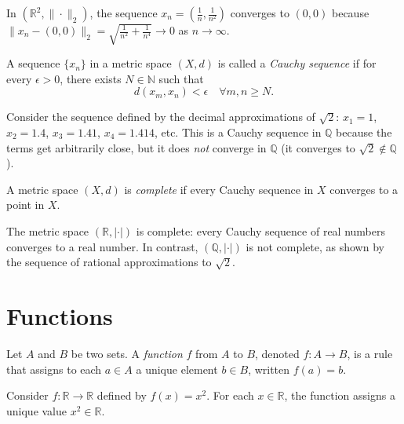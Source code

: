 \begin{example}
In $(\mathbb{R}^2, \|\cdot\|_2)$, the sequence $x_n = \left(\frac{1}{n}, \frac{1}{n^2}\right)$ converges to $(0,0)$ because $\|x_n - (0,0)\|_2 = \sqrt{\frac{1}{n^2} + \frac{1}{n^4}} \to 0$ as $n \to \infty$.
\end{example}

\begin{definition}
A sequence $\{x_n\}$ in a metric space $(X,d)$ is called a \emph{Cauchy sequence} if for every $\epsilon > 0$, there exists $N \in \mathbb{N}$ such that
\[
d(x_m, x_n) < \epsilon \quad \forall m,n \geq N.
\]
\end{definition}

\begin{example}
Consider the sequence defined by the decimal approximations of $\sqrt{2}$: $x_1 = 1$, $x_2 = 1.4$, $x_3 = 1.41$, $x_4 = 1.414$, etc.  
This is a Cauchy sequence in $\mathbb{Q}$ because the terms get arbitrarily close, but it does \emph{not} converge in $\mathbb{Q}$ (it converges to $\sqrt{2} \notin \mathbb{Q}$).
\end{example}

\begin{definition}
A metric space $(X,d)$ is \emph{complete} if every Cauchy sequence in $X$ converges to a point in $X$.
\end{definition}

\begin{example}
The metric space $(\mathbb{R}, |\cdot|)$ is complete: every Cauchy sequence of real numbers converges to a real number.  
In contrast, $(\mathbb{Q}, |\cdot|)$ is not complete, as shown by the sequence of rational approximations to $\sqrt{2}$.
\end{example}

\section{Functions}

\begin{definition}[Function]
Let $A$ and $B$ be two sets.  
A \emph{function} $f$ from $A$ to $B$, denoted $f:A \to B$, is a rule that assigns to each $a \in A$ a unique element $b \in B$, written $f(a) = b$.  
\end{definition}

\begin{example}
Consider $f:\mathbb{R} \to \mathbb{R}$ defined by $f(x) = x^2$.  
For each $x \in \mathbb{R}$, the function assigns a unique value $x^2 \in \mathbb{R}$.  
\end{example}

